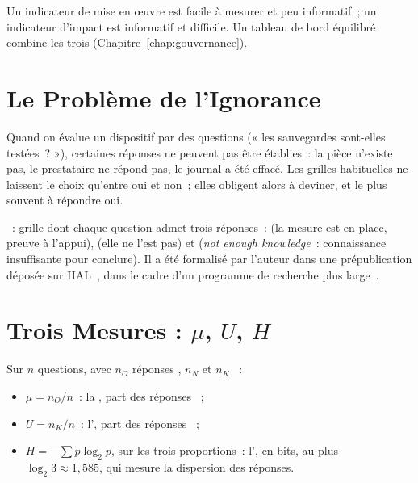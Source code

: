 Un indicateur de mise en œuvre est facile à mesurer et peu informatif~;
un indicateur d'impact est informatif et difficile. Un tableau de bord
équilibré combine les trois (Chapitre~\ref{chap:gouvernance}).

\section{Le Problème de l'Ignorance}
\label{sec:c26-ignorance}

Quand on évalue un dispositif par des questions (« les sauvegardes
sont-elles testées~? »), certaines réponses ne peuvent pas être établies~:
la pièce n'existe pas, le prestataire ne répond pas, le journal a été
effacé. Les grilles habituelles ne laissent le choix qu'entre oui et non~;
elles obligent alors à deviner, et le plus souvent à répondre oui.

\begin{boxdef}
~: grille dont chaque question admet
trois réponses~: \OUI{} (la mesure est en place, preuve à l'appui),
\NON{} (elle ne l'est pas) et \NEK{} (\emph{not enough knowledge}~:
connaissance insuffisante pour conclure). Il a été formalisé par l'auteur
dans une prépublication déposée sur HAL~\cite{minka2026nek}, dans le cadre
d'un programme de recherche plus large~\cite{minka2026auditologie}.
\end{boxdef}

\section{Trois Mesures : \texorpdfstring{\(\mu\), \(U\), \(H\)}{mu, U, H}}
\label{sec:c26-mesures}

Sur \(n\) questions, avec \(n_O\) réponses \OUI{}, \(n_N\) \NON{} et
\(n_K\) \NEK{}~:

\begin{itemize}
    \item \(\mu = n_O / n\)~: la , part des réponses
          \OUI{}~;
    \item \(U = n_K / n\)~: l', part des réponses
          \NEK{}~;
    \item \(H = -\sum p \log_2 p\), sur les trois proportions~:
          l', en bits, au plus \(\log_2 3 \approx 1{,}585\),
          qui mesure la dispersion des réponses.
\end{itemize}

